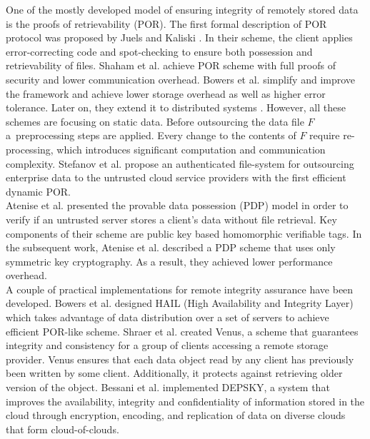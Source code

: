 One of the mostly developed model of ensuring integrity of remotely stored data
is the proofs of retrievability (POR). The first formal description of POR
protocol was proposed by Juels and Kaliski \cite{por}. In their scheme,
the client applies error-correcting code and spot-checking to ensure both
possession and retrievability of files. Shaham et al. \cite{compact-por}
achieve POR scheme with full proofs of security and lower communication
overhead. Bowers et al. \cite{por2} simplify and improve the framework and
achieve lower storage overhead as well as higher error tolerance. Later on, 
they extend it to distributed systems \cite{hail}. However, all these schemes
are focusing on static data. Before outsourcing the data file $F$ 
a~preprocessing steps are applied. Every change to the contents of $F$ require
re-processing, which introduces significant computation and communication
complexity. Stefanov et al. \cite{iris} propose an authenticated file-system
for outsourcing enterprise data to the untrusted cloud service providers with
the first efficient dynamic POR.\\

Atenise et al. \cite{pdp} presented the provable data possession (PDP) model
in order to verify if an untrusted server stores a client's data without file
retrieval. Key components of their scheme are public key based homomorphic
verifiable tags. In the subsequent work, Atenise et al. \cite{pdp2} described
a PDP scheme that uses only symmetric key cryptography. As a result, they
achieved lower performance overhead.\\

A couple of practical implementations for remote integrity assurance have been
developed. Bowers et al. \cite{hail} designed HAIL (High Availability and
Integrity Layer) which takes advantage of data distribution over a set of
servers to achieve efficient POR-like scheme. Shraer et al. \cite{venus}
created Venus, a scheme that guarantees integrity and consistency for a group
of clients accessing a remote storage provider. Venus ensures that each data
object read by any client has previously been written by some client.
Additionally, it protects against retrieving older version of the object.
Bessani et al. \cite{depsky} implemented DEPSKY, a system that improves the
availability, integrity and confidentiality of information stored in the cloud
through encryption, encoding, and replication of data on diverse clouds that
form cloud-of-clouds.\\

